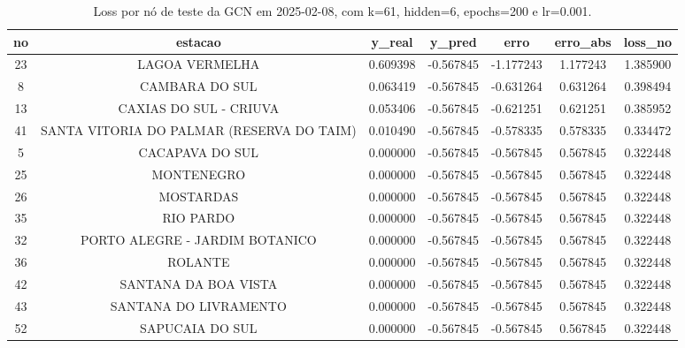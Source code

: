 \begin{table}[h]
\centering
\caption{Loss por nó de teste da GCN em 2025-02-08, com k=61, hidden=6, epochs=200 e lr=0.001.}
\label{tab:gcn_loss_nodes_k61_hidden6}
\begin{tabular}{ccccccc}
\toprule
no & estacao & y\_real & y\_pred & erro & erro\_abs & loss\_no \\
\midrule
23 & LAGOA VERMELHA & 0.609398 & -0.567845 & -1.177243 & 1.177243 & 1.385900 \\
8 & CAMBARA DO SUL & 0.063419 & -0.567845 & -0.631264 & 0.631264 & 0.398494 \\
13 & CAXIAS DO SUL - CRIUVA & 0.053406 & -0.567845 & -0.621251 & 0.621251 & 0.385952 \\
41 & SANTA VITORIA DO PALMAR (RESERVA DO TAIM) & 0.010490 & -0.567845 & -0.578335 & 0.578335 & 0.334472 \\
5 & CACAPAVA DO SUL & 0.000000 & -0.567845 & -0.567845 & 0.567845 & 0.322448 \\
25 & MONTENEGRO & 0.000000 & -0.567845 & -0.567845 & 0.567845 & 0.322448 \\
26 & MOSTARDAS & 0.000000 & -0.567845 & -0.567845 & 0.567845 & 0.322448 \\
35 & RIO PARDO & 0.000000 & -0.567845 & -0.567845 & 0.567845 & 0.322448 \\
32 & PORTO ALEGRE - JARDIM BOTANICO & 0.000000 & -0.567845 & -0.567845 & 0.567845 & 0.322448 \\
36 & ROLANTE & 0.000000 & -0.567845 & -0.567845 & 0.567845 & 0.322448 \\
42 & SANTANA DA BOA VISTA & 0.000000 & -0.567845 & -0.567845 & 0.567845 & 0.322448 \\
43 & SANTANA DO LIVRAMENTO & 0.000000 & -0.567845 & -0.567845 & 0.567845 & 0.322448 \\
52 & SAPUCAIA DO SUL & 0.000000 & -0.567845 & -0.567845 & 0.567845 & 0.322448 \\
\bottomrule
\end{tabular}
\end{table}
